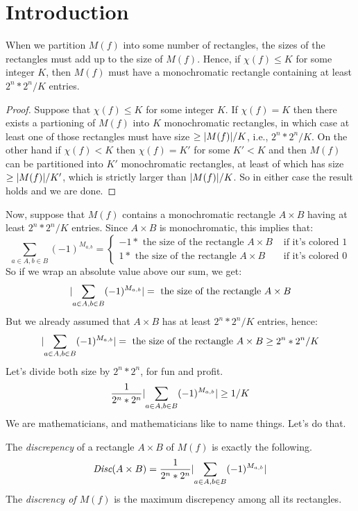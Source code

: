 \documentclass[12pt]{article}
\begin{document}
\maketitle

\section{Introduction}

When we partition $M(f)$ into some number of rectangles,
	the sizes of the rectangles must add up to the size of $M(f)$.
Hence, if $\chi(f) \leq K$ for some integer $K$,
	then $M(f)$ must have a monochromatic rectangle containing at least $2^n * 2^n / K$ entries.
\begin{proof}
Suppose that $\chi(f) \leq K$ for some integer $K$.
If $\chi(f) = K$ then there exists a partioning of $M(f)$ into $K$ monochromatic rectangles, in which case at least one of those rectangles must have size $\geq \lvert M(f)\rvert / K$, i.e., $2^n * 2^n / K$.  On the other hand if $\chi(f) < K$ then $\chi(f) = K'$ for some $K' < K$ and then $M(f)$ can be partitioned into $K'$ monochromatic rectangles, at least of which has size $\geq \lvert M(f)\rvert / K'$, which is strictly larger than $\lvert M(f)\rvert / K$.  So in either case the result holds and we are done.
\end{proof}
Now, suppose that $M(f)$ contains a monochromatic rectangle $A \times B$ having at least $2^n * 2^n / K$ entries.
Since $A \times B$ is monochromatic, this implies that:
\[\sum_{a \in A, b \in B} (-1)^{M_{a,b}} = \begin{cases}
-1 * \text{ the size of the rectangle } A \times B & \text{ if it's colored } 1 \\
 1 * \text{ the size of the rectangle } A \times B & \text{ if it's colored } 0\end{cases}\]
So if we wrap an absolute value above our sum, we get:
\[\lvert\sum_{a \in A, b \in B} (-1)^{M_{a,b}}\rvert = \text{ the size of the rectangle } A \times B\]
But we already assumed that $A \times B$ has at least $2^n * 2^n / K$ entries, hence:
\[\lvert\sum_{a \in A, b \in B} (-1)^{M_{a,b}}\rvert = \text{ the size of the rectangle } A \times B \geq 2^n * 2^n / K\]
Let's divide both size by $2^n * 2^n$, for fun and profit.
\[\frac{1}{2^n * 2^n}\lvert\sum_{a \in A, b \in B} (-1)^{M_{a,b}}\rvert \geq 1 / K\]
We are mathematicians, and mathematicians like to name things.
Let's do that.
\begin{definition}[Discrepency]
The \emph{discrepency} of a rectangle $A \times B$ of $M(f)$ is exactly the following.
\[\emph{Disc}(A \times B) = \frac{1}{2^n * 2^n}\lvert\sum_{a \in A, b \in B} (-1)^{M_{a,b}}\rvert\]
The \emph{discrency of $M(f)$} is the maximum discrepency among all its rectangles.
\end{definition}
\end{document}
